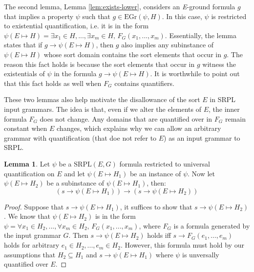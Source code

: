 \documentclass[12pt]{article}
\theoremstyle{definition}
\newtheorem{lemma}{Lemma}
\theoremstyle{remark}
\newcommand{\gr}{\text{EGr}}
\newcommand{\SRPL}{\text{SRPL}}
\begin{document}
The second lemma, Lemma \ref{lem:exists-lower}, considers an \textit{E}-ground formula $g$ that implies a property $\psi$ such that $g \in \gr(\psi,H)$.  In this case, $\psi$ is restricted to existential quantification, i.e. it is in the form $\psi(E \mapsto H) = \exists x_1 \in H,...,\exists x_m \in H, \, F_G(x_1,...,x_m)$.  Essentially, the lemma states that if $g \rightarrow \psi(E \mapsto H)$, then $g$ also implies any subinstance of $\psi(E \mapsto H)$ whose sort domain contains the sort elements that occur in $g$.  The reason this fact holds is because the sort elements that occur in $g$ witness the existentials of $\psi$ in the formula $g \rightarrow \psi(E \mapsto H)$.  It is worthwhile to point out that this fact holds as well when $F_G$ contains quantifiers.

These two lemmas also help motivate the disallowance of the sort $E$ in SRPL input grammars.  The idea is that, even if we alter the elements of $E$, the inner formula $F_G$ does not change.  Any domains that are quantified over in $F_G$ remain constant when $E$ changes, which explains why we can allow an arbitrary grammar with quantification (that doe not refer to $E$) as an input grammar to SRPL.

\begin{lemma}
  \label{lem:forall-lower}
  Let $\psi$ be a $\SRPL(E,G)$ formula restricted to universal quantification on $E$ and let $\psi(E \mapsto H_1)$ be an instance of $\psi$.  Now let $\psi(E \mapsto H_2)$ be a subinstance of $\psi(E \mapsto H_1)$, then:
  $$(s \rightarrow \psi(E \mapsto H_1)) \rightarrow (s \rightarrow \psi(E \mapsto H_2))$$
\end{lemma}
\begin{proof}
  Suppose that $s \rightarrow \psi(E \mapsto H_1)$, it suffices to show that $s \rightarrow \psi(E \mapsto H_2)$.  We know that $\psi(E \mapsto H_2)$ is in the form $\psi = \forall x_1 \in H_2,...,\forall x_m \in H_2, \, F_G(x_1,...,x_m)$, where $F_G$ is a formula generated by the input grammar $G$.  Then $s \rightarrow \psi(E \mapsto H_2)$ holds iff $s \rightarrow F_G(e_1,...,e_m)$ holds for arbitrary $e_1 \in H_2,...,e_m \in H_2$.  However, this formula must hold by our assumptions that $H_2 \subseteq H_1$ and $s \rightarrow \psi(E \mapsto H_1)$ where $\psi$ is unversally quantified over $E$.
\end{proof}
\end{document}
